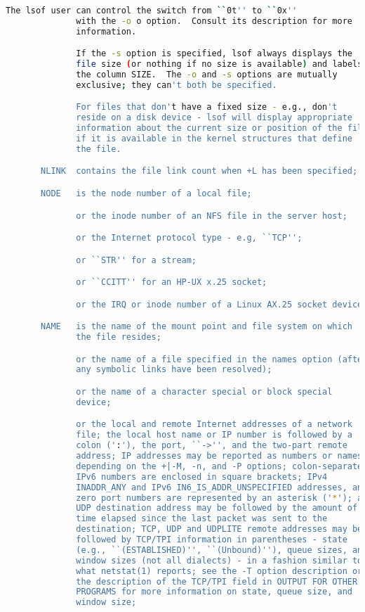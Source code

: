 {{\begin{lstlisting}[language=bash]
              The lsof user can control the switch from ``0t'' to ``0x''
              with the -o o option.  Consult its description for more
              information.

              If the -s option is specified, lsof always displays the
              file size (or nothing if no size is available) and labels
              the column SIZE.  The -o and -s options are mutually
              exclusive; they can't both be specified.

              For files that don't have a fixed size - e.g., don't
              reside on a disk device - lsof will display appropriate
              information about the current size or position of the file
              if it is available in the kernel structures that define
              the file.

       NLINK  contains the file link count when +L has been specified;

       NODE   is the node number of a local file;

              or the inode number of an NFS file in the server host;

              or the Internet protocol type - e.g, ``TCP'';

              or ``STR'' for a stream;

              or ``CCITT'' for an HP-UX x.25 socket;

              or the IRQ or inode number of a Linux AX.25 socket device.

       NAME   is the name of the mount point and file system on which
              the file resides;

              or the name of a file specified in the names option (after
              any symbolic links have been resolved);

              or the name of a character special or block special
              device;

              or the local and remote Internet addresses of a network
              file; the local host name or IP number is followed by a
              colon (':'), the port, ``->'', and the two-part remote
              address; IP addresses may be reported as numbers or names,
              depending on the +|-M, -n, and -P options; colon-separated
              IPv6 numbers are enclosed in square brackets; IPv4
              INADDR_ANY and IPv6 IN6_IS_ADDR_UNSPECIFIED addresses, and
              zero port numbers are represented by an asterisk ('*'); a
              UDP destination address may be followed by the amount of
              time elapsed since the last packet was sent to the
              destination; TCP, UDP and UDPLITE remote addresses may be
              followed by TCP/TPI information in parentheses - state
              (e.g., ``(ESTABLISHED)'', ``(Unbound)''), queue sizes, and
              window sizes (not all dialects) - in a fashion similar to
              what netstat(1) reports; see the -T option description or
              the description of the TCP/TPI field in OUTPUT FOR OTHER
              PROGRAMS for more information on state, queue size, and
              window size;


\end{lstlisting}}}
